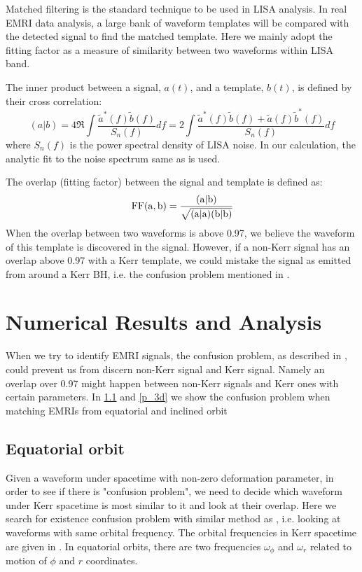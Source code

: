 \documentclass{article}
\begin{document}
Matched filtering is the standard technique to be used in LISA analysis. In real EMRI data analysis, a large bank of waveform templates will be compared with the detected signal to find the matched template. Here we mainly adopt the fitting factor as a measure of similarity between two waveforms within LISA band. 

The inner product between a signal, $a(t)$, and a template, $b(t)$, is defined by their cross correlation: \cite{product}
\begin{equation}
	(a|b)=4\Re\int \frac{\tilde{a}^*(f) \tilde{b}(f)}{S_n(f)}df =2\int \frac{\tilde{a}^*(f) \tilde{b}(f) +\tilde{a}(f) \tilde{b}^*(f) }{S_n(f)}df
\end{equation}
where $S_n(f)$ is the power spectral density of LISA noise. In our calculation, the analytic fit to the noise spectrum same as \cite{kludge} is used.

The overlap (fitting factor) between the signal and template is defined as:
\begin{equation}
	\rm {FF}(a,b)=\frac{(a|b)}{\sqrt{(a|a)(b|b)}}
\end{equation}
When the overlap between two waveforms is above 0.97, we believe the waveform of this template is discovered in the signal. However, if a non-Kerr signal has an overlap above 0.97 with a Kerr template, we could mistake the signal as emitted from around a Kerr BH, i.e. the confusion problem mentioned in \cite{sameOmg}.

\section{Numerical Results and Analysis}
\label{p_conf}
When we try to identify EMRI signals, the confusion problem, as described in \cite{sameOmg}, could prevent us from discern non-Kerr signal and Kerr signal. Namely an overlap over 0.97 might happen between non-Kerr signals and Kerr ones with certain parameters. In \ref{p_2d} and \ref{p_3d} we show the confusion problem when matching EMRIs from equatorial and inclined orbit 
\subsection{Equatorial orbit}
\label{p_2d}
Given a waveform under spacetime with non-zero deformation parameter, in order to see if there is "confusion problem", we need to decide which waveform under Kerr spacetime is most similar to it and look at their overlap. Here we search for existence confusion problem with similar method as \cite{majorPRD}, i.e. looking at waveforms with same orbital frequency. The orbital frequencies in Kerr spacetime are given in \cite{tauOmg}. In equatorial orbits, there are two frequencies $\omega_\phi$ and $\omega_r$ related to motion of $\phi$ and $r$ coordinates.
\end{document}
